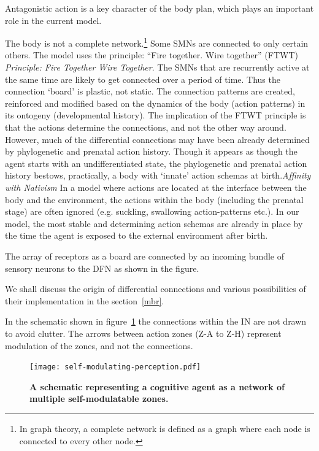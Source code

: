 Antagonistic action is a key character of the body plan, which plays an important role in the current model. 

The body is not a complete network.\footnote{In graph theory, a complete network is defined as a graph where each node is connected to every other node.} Some SMNs are connected to only certain others. The model uses the principle: ``Fire together. Wire together'' (FTWT) \cite{hebb1949organisation}\emph{Principle: Fire Together Wire Together}. The SMNs that are recurrently active at the same time are likely to get connected over a period of time. Thus the connection `board' is plastic, not static. The connection patterns are created, reinforced and modified based on the dynamics of the body (action patterns) in its ontogeny (developmental history). The implication of the FTWT principle is that the actions determine the connections, and not the other way around. However, much of the differential connections may have been already determined by phylogenetic and prenatal action history. Though it appears as though the agent starts with an undifferentiated state, the phylogenetic and prenatal action history bestows, practically, a body with `innate' action schemas at birth.\emph{Affinity with Nativism} In a model where actions are located at the interface between the body and the environment, the actions within the body (including the prenatal stage) are often ignored (e.g. suckling, swallowing action-patterns etc.). In our model, the most stable and determining action schemas are already in place by the time the agent is exposed to the external environment after birth.

The array of receptors as a board are connected by an incoming bundle of sensory neurons to the DFN as shown in the figure.


We shall discuss the origin of differential connections and various possibilities of their implementation in the section~\ref{mbr}.

In the schematic shown in figure~\ref{smn} the connections within the IN are not drawn to avoid clutter. The arrows between action zones (Z-A to Z-H) represent modulation of the zones, and not the connections. 

\begin{figure}[ht] 
\texttt{[image: self-modulating-perception.pdf]}
\caption{\color{Gray} \textbf{A schematic representing a cognitive agent as a network of multiple self-modulatable zones.}}
\label{smn} %
\end{figure}

